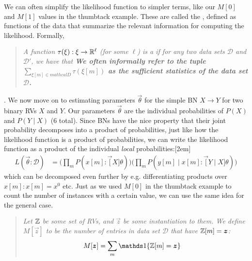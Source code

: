 \documentclass[11pt]{article}
\begin{document}
\p We can often simplify the likelihood function to simpler terms, like our $M[0]$ and $M[1]$ values in the thumbtack example. These are called the , defined as functions of the data that summarize the relevant information for computing the likelihood. Formally,
\vspace{-0.5em}
\begin{quote}
	{\small\itshape 
		A function $\tau(\xi) : \xi \rightarrow \mathbb{R}^{\ell}$ (for some $\ell$) is a  if for any two data sets $\mathcal D$ and $\mathcal{D}'$, we have that
		\graybox{
			\bigg[ \sum_{ \xi[m] \in \mathcal D } \tau(\xi[m])	 = \sum_{ \xi'[m] \in \mathcal D' } \tau(\xi'[m]) \bigg]
			\implies 
			\bigg[ L(\vec{\theta} : \mathcal D) = L(\vec{\theta} : \mathcal D')    \bigg]
		} 
		\textbf{We often informally refer to the tuple $\sum_{\xi[m] \in mathcal D} \tau(\xi[m])$ as the sufficient statistics of the data set $\mathcal D$.}
	}
\end{quote}

\myspace
\p {}. We now move on to estimating parameters $\vec{\theta}$ for the simple BN $X \rightarrow Y$ for two binary RVs $X$ and $Y$. Our parameters $\vec{\theta}$ are the individual probabilities of $P(X)$ and $P(Y \mid X)$ (6 total). Since BNs have the nice property that their joint probability decomposes into a product of probabilities, just like how the likelihood function is a product of probabilities, we can write the likelihood function as a product of the individual \textit{local} probabilities:[2em]
\begin{align}
	L(\vec{\theta} : \mathcal D) &= \bigg( \prod_m P(x[m] : \vec[X]{\theta})  \bigg) \bigg( \prod_m P(y[m] \mid x[m] : \vec[Y \mid X]{\theta}) \bigg)
\end{align}
which can be decomposed even further by e.g. differentiating products over $x[m]:x[m]=x^0$ etc. Just as we used $M[0]$ in the thumbtack example to count the number of instances with a certain value, we can use the same idea for the general case. 
\vspace{-0.5em}%
\begin{quote}
	{\small\itshape
		Let $\mathbb{Z}$ be some set of RVs, and $\vec{z}$ be some instantiation to them. We define $M[\vec{z}]$ to be the number of entries in data set $\mathcal D$ that have $\mathbb{Z}[m] = \bm{z}_{}$:
		\begin{align}
			M[\vec z] &= \sum_m \ind\{\Z[m] = \vec z \}
		\end{align}
	}
\end{quote}
\end{document}
